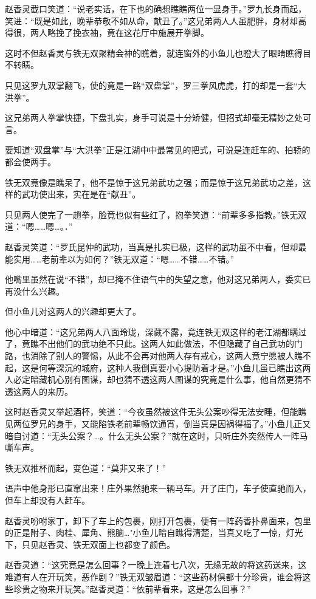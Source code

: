 \documentclass[12pt,oneside]{book}
\begin{document}
赵香灵截口笑道：``说老实话，在下也的确想瞧瞧两位一显身手。''罗九长身而起，笑进：``既是如此，晚辈恭敬不如从命，献丑了。''这兄弟两人人虽肥胖，身材却高得很，两人略挽了挽衣袖，竟在这花厅中施展开拳脚。

这时不但赵香灵与铁无双聚精会神的瞧着，就连窗外的小鱼儿也瞪大了眼睛瞧得目不转睛。

只见这罗九双掌翻飞，使的竟是一路``双盘掌''，罗三拳风虎虎，打的却是一套``大洪拳''。

这兄弟两人拳掌快捷，下盘扎实，身手可说是十分矫健，但招式却毫无精妙之处可言。

要知道``双盘掌''与``大洪拳''正是江湖中中最常见的把式，可说是连赶车的、拍轿的都会使两手。

铁无双竟像是瞧呆了，他不是惊于这兄弟武功之强；而是惊于这兄弟武功之差，这样的武功使出来，实在是在``献丑''。

只见两人使完了一趟拳，脸竟也似有些红了，抱拳笑道：``前辈多多指教。''铁无双道：``嗯\ldots\ldots 嗯\ldots。．''

赵香灵笑道：``罗氏昆仲的武功，当真是扎实已极，这样的武功虽不中看，但却最能实用\ldots\ldots 老前辈以为如何？''铁无双道：``嗯\ldots\ldots 不错\ldots\ldots 不错。''

他嘴里虽然在说``不错''，却已掩不住语气中的失望之意，他对这兄弟两人，委实已再没什么兴趣。

但小鱼儿对这两人的兴趣却更大了。

他心中暗道：``这兄弟两人八面玲珑，深藏不露，竟连铁无双这样的老江湖都瞒过了，竟瞧不出他们的武功绝不只此。这两人如此做法，不但隐藏了自己武功的门路，也消除了别人的警惕，从此不会再对他两人存有戒心，这两人竟宁愿被人瞧不起，这是何等深沉的城府，这种人我倒真要小心提防着才是。''小鱼儿虽已瞧出这两人必定暗藏机心别有图谋，却也猜不透这两人图谋的究竟是什么事，他自然更猜不透这两人的来历。

这时赵香灵又举起酒杯，笑道：``今夜虽然被这件无头公案吵得无法安睡，但能瞧见两位罗兄的身手，又能陷铁老前辈畅饮通宵，倒当真是因祸得福了。''小鱼儿正又暗自讨道：``无头公案？\ldots。什么无头公案？''就在这时，只听庄外突然传人一阵马嘶车声。

铁无双推杯而起，变色道：``莫非又来了！''

语声中他身形已直窜出来！庄外果然驰来一辆马车。开了庄门，车子使直驰而入，但车上却没有人赶车。

赵香灵吩咐家丁，卸下了车上的包裹，刚打开包裹，便有一阵药香扑鼻面来，包里的正是附子、肉桂、犀角、熊脑\ldots"小鱼儿暗自瞧得清楚，当真又吃了一惊，灯光下，只见赵香灵、铁无双面上也都变了颜色。

赵香灵道：``这究竟是怎么回事？一晚上连着七八次，无缘无故的将这药送来，这难道有人在开玩笑，恶作剧？''铁无双皱眉道：``这些药材俱都十分珍贵，谁会将这些珍贵之物来开玩笑。''赵香灵道：``依前辈看来，这是怎么回事？''
\end{document}
